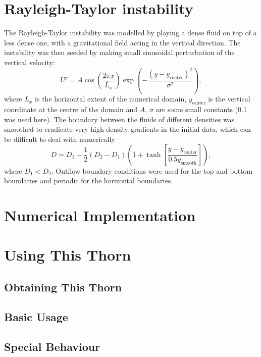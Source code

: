 \section{Rayleigh-Taylor instability}
\label{sec:Rayleigh-Taylor}
The Rayleigh-Taylor instability was modelled by playing a dense fluid on top of a less dense one, with a gravitational field acting in the vertical direction. The instability was then seeded by making small sinusoidal perturbation of the vertical velocity:
\begin{equation}
U^y = A \cos\left(\frac{2\pi x}{L_x}\right) \exp\left(-\frac{(y-y_\text{center})^2}{\sigma^2}\right),
\end{equation}
where \(L_x\) is the horizontal extent of the numerical domain, \(y_\text{center}\) is the vertical coordinate at the centre of the domain and \(A\), \(\sigma\) are some small constants (0.1 was used here). The boundary between the fluids of different densities was smoothed to eradicate very high density gradients in the initial data, which can be difficult to deal with numerically
\begin{equation}
D = D_1 + \frac{1}{2}(D_2 - D_1)\left(1 + \tanh\left[\frac{y - y_\text{center}}{0.5y_\text{smooth}}\right]\right),
\end{equation}
where \(D_1 < D_2\).
Outflow boundary conditions were used for the top and bottom boundaries and periodic for the horizontal boundaries. 

\section{Numerical Implementation}

\section{Using This Thorn}

\subsection{Obtaining This Thorn}

\subsection{Basic Usage}

\subsection{Special Behaviour}

